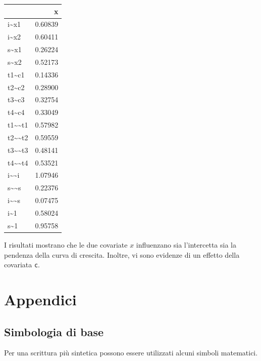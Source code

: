 \documentclass[
  11pt,
]{krantz}
\theoremstyle{definition}
\theoremstyle{definition}
\theoremstyle{definition}
\theoremstyle{definition}
\theoremstyle{remark}
\begin{document}
\begin{longtable}[]{@{}lr@{}}
\toprule
& x \\
\midrule
\endhead
i\textasciitilde x1 & 0.60839 \\
i\textasciitilde x2 & 0.60411 \\
s\textasciitilde x1 & 0.26224 \\
s\textasciitilde x2 & 0.52173 \\
t1\textasciitilde c1 & 0.14336 \\
t2\textasciitilde c2 & 0.28900 \\
t3\textasciitilde c3 & 0.32754 \\
t4\textasciitilde c4 & 0.33049 \\
t1\textasciitilde\textasciitilde t1 & 0.57982 \\
t2\textasciitilde\textasciitilde t2 & 0.59559 \\
t3\textasciitilde\textasciitilde t3 & 0.48141 \\
t4\textasciitilde\textasciitilde t4 & 0.53521 \\
i\textasciitilde\textasciitilde i & 1.07946 \\
s\textasciitilde\textasciitilde s & 0.22376 \\
i\textasciitilde\textasciitilde s & 0.07475 \\
i\textasciitilde1 & 0.58024 \\
s\textasciitilde1 & 0.95758 \\
\bottomrule
\end{longtable}

I risultati mostrano che le due covariate \(x\) influenzano sia l'intercetta sia la pendenza della curva di crescita. Inoltre, vi sono evidenze di un effetto della covariata \texttt{c}.

\mainmatter

\hypertarget{part-appendici}{%
\part{Appendici}\label{part-appendici}}

\hypertarget{appendix-appendici}{%
\appendix {}}


\hypertarget{simbologia-di-base}{%
\chapter{Simbologia di base}\label{simbologia-di-base}}

Per una scrittura più sintetica possono essere utilizzati alcuni simboli matematici.
\end{document}
